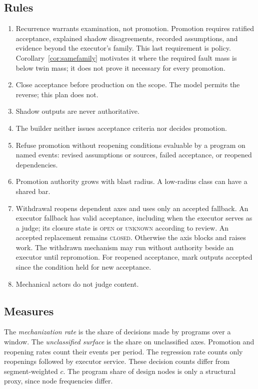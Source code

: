 \documentclass[11pt]{article}
\theoremstyle{definition}
\theoremstyle{remark}
\newcommand{\cstate}[1]{\textup{\textsc{#1}}}
\begin{document}
\subsection{Rules}\label{sec:planrules}
\begin{enumerate}[leftmargin=1.6em,itemsep=2pt]
\item Recurrence warrants examination, not promotion. Promotion requires ratified acceptance,
explained shadow disagreements, recorded assumptions, and evidence beyond the executor's family.
This last requirement is policy. Corollary~\ref{cor:samefamily} motivates it where the required
fault mass is below twin mass; it does not prove it necessary for every promotion.
\item Close acceptance before production on the scope. The model permits the reverse; this plan does not.
\item Shadow outputs are never authoritative.
\item The builder neither issues acceptance criteria nor decides promotion.
\item Refuse promotion without reopening conditions evaluable by a program on named events:
revised assumptions or sources, failed acceptance, or reopened dependencies.
\item Promotion authority grows with blast radius. A low-radius class can have a shared bar.
\item Withdrawal reopens dependent axes and uses only an accepted fallback.
An executor fallback has valid acceptance, including when the executor serves as a judge;
its closure state is \cstate{open} or \cstate{unknown} according to review.
An accepted replacement remains \cstate{closed}. Otherwise the axis blocks and raises work.
The withdrawn mechanism may run without authority beside an executor until repromotion.
For reopened acceptance, mark outputs accepted since the condition held for new acceptance.
\item Mechanical actors do not judge content.
\end{enumerate}

\subsection{Measures}\label{sec:planmeasures}
The \emph{mechanization rate} is the share of decisions made by programs over a window.
The \emph{unclassified surface} is the share on unclassified axes.
Promotion and reopening rates count their events per period.
The regression rate counts only reopenings followed by executor service.
These decision counts differ from segment-weighted $c$.
The program share of design nodes is only a structural proxy, since node frequencies differ.
\end{document}
